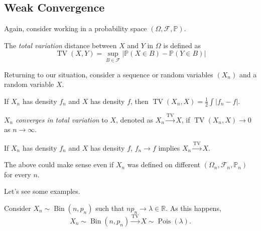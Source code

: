 \subsection{Weak Convergence}
Again, consider working in a probability space \((\Omega , \mathscr{F} , \mathbb{P} )\).

\begin{definition}\label{def:total-variation}
	The \emph{total variation} distance between \(X\) and \(Y\) in \(\Omega \) is defined as
	\[
		\operatorname{TV}(X, Y) = \sup_{B \in \mathscr{F} } \left\vert \mathbb{P} (X \in B) - \mathbb{P} (Y \in B) \right\vert
	\]
\end{definition}

Returning to our situation, consider a sequence or random variables \((X_n)\) and a random variable \(X\).

\begin{remark}
	If \(X_n\) has density \(f_n\) and \(X\) has density \(f\), then \(\operatorname{TV}(X_n, X) = \frac{1}{2} \int \vert f_n - f \vert \).
\end{remark}

\begin{definition}\label{def:convergence-in-total-variation}
	\(X_n\) \emph{converges in total variation} to \(X\), denoted as \(X_n \overset{\operatorname{TV}}{\to } X\), if \(\operatorname{TV}(X_n, X) \to 0\) as \(n \to \infty \).
\end{definition}

\begin{remark}
	If \(X_n\) has density \(f_n\) and \(X\) has density \(f\), \(f_n \to f\) implies \(X_n \overset{\operatorname{TV} }{\to } X\).
\end{remark}

\begin{note}
	The above could make sense even if \(X_n\) was defined on different \((\Omega _n , \mathscr{F} _n, \mathbb{P} _n)\) for every \(n\).
\end{note}

Let's see some examples.

\begin{eg}
	Consider \(X_n \sim \operatorname{Bin}(n, p_n) \) such that \(n p_n \to \lambda \in \mathbb{R} \). As this happens,
	\[
		X_n \sim \operatorname{Bin}(n, p_n)
		\overset{\operatorname{TV} }{\to } X \sim \operatorname{Pois}(\lambda ).
	\]
\end{eg}

